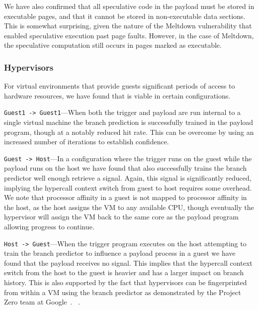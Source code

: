 We have also confirmed that all speculative code in the payload must be
stored in executable pages, and that it cannot be stored in non-executable data
sections. This is somewhat surprising, given the nature of the Meltdown
vulnerability that enabled speculative execution past page faults. However, in
the case of Meltdown, the speculative computation still occurs in pages marked
as executable.



\subsubsection{Hypervisors}
For virtual environments that provide guests significant periods of access to 
hardware resources, we have found that \speculake is viable in certain configurations. 

\texttt{Guest1 -> Guest1}---When both the trigger and payload are run internal to a
single virtual machine the branch prediction is successfully trained in the
payload program, though at a notably reduced hit rate. This can be overcome by
using an increased number of iterations to establish confidence. 

\texttt{Guest -> Host}---In a configuration where the trigger runs on the guest
while the payload runs on the host we have found that \speculake also
successfully trains the branch predictor well enough retrieve a signal. Again,
this signal is significantly reduced, implying the hypercall context switch from
guest to host requires some overhead. We note that processor affinity in a guest
is not mapped to processor affinity in the host, as the host assigns the VM to
any available CPU, though eventually the hypervisor will assign the VM back to
the same core as the payload program allowing progress to continue.

\texttt{Host -> Guest}---When the trigger program executes on the host
attempting to train the
branch predictor to influence a payload process in a guest we have found that
the payload receives no signal. This implies that the hypercall context switch
from the host to the guest is heavier and has a larger impact on branch history.
This is also supported by the fact that hypervisors can be fingerprinted from 
within a VM using the branch predictor as demonstrated by the Project Zero 
team at Google~\cite{}.
~\cite{project_zero}.

